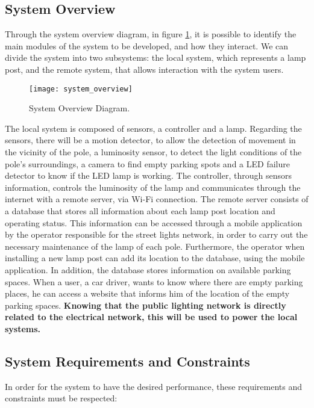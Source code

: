 \subsection{System Overview}
Through the system overview diagram, in figure \ref{fig:system_overview}, it is possible to identify the main modules of the system to be developed, and how they interact. We can divide the system into two subsystems: the local system, which represents a lamp post, and the remote system, that allows interaction with the system users.

\begin{figure}[ht]
	\centering
	\texttt{[image: system\_overview]}
	\caption{System Overview Diagram.}
	\label{fig:system_overview}
\end{figure}

The local system is composed of sensors, a controller and a lamp. Regarding the sensors, there will be a motion detector, to allow the detection of movement in the vicinity of the pole, a luminosity sensor, to detect the light conditions of the pole’s surroundings, a camera to find empty parking spots and a LED failure detector to know if the LED lamp is working. The controller, through sensors information, controls the luminosity of the lamp and communicates through the internet with a remote server, via Wi-Fi connection. 
The remote server consists of a database that stores all information about each lamp post location and operating status. This information can be accessed through a mobile application by the operator  responsible for the street lights network, in order to carry out the necessary maintenance of the lamp of each pole. Furthermore, the operator when installing a new lamp post can add its location to the database, using the mobile application. In addition, the database stores information on available parking spaces. When a user, a car driver, wants to know where there are empty parking places, he can access a website that informs him of the location of the empty parking spaces. \textbf{Knowing that the public lighting network is directly related to the electrical network, this will be used to power the local systems.}

\subsection{System Requirements and Constraints}
In order for the system to have the desired performance, these requirements and constraints must be respected:


